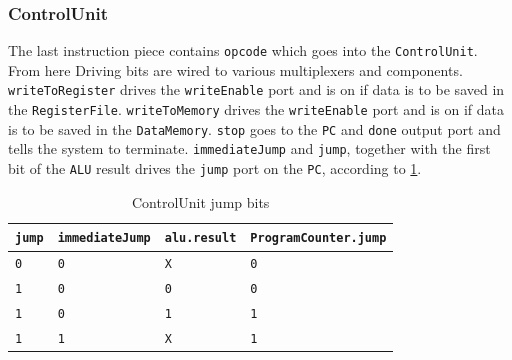 \documentclass[a4paper, english]{article}
\numberwithin{equation}{section}
\begin{document}
\subsubsection{ControlUnit}
The last instruction piece contains \texttt{opcode} which goes into the \texttt{ControlUnit}. From here Driving bits are wired to various multiplexers and components. \texttt{writeToRegister} drives the \texttt{writeEnable} port and is on if data is to be saved in the \texttt{RegisterFile}. \texttt{writeToMemory} drives the \texttt{writeEnable} port and is on if data is to be saved in the \texttt{DataMemory}. \texttt{stop} goes to the \texttt{PC} and \texttt{done} output port and tells the system to terminate. \texttt{immediateJump} and \texttt{jump}, together with the first bit of the \texttt{ALU} result drives the \texttt{jump} port on the \texttt{PC}, according to \cref{tbl:jmpbits}.
\begin{table}[H]
    \centering
    \caption{ControlUnit jump bits}\label{tbl:jmpbits}
    \begin{tabular}{llll}
        \toprule
        \texttt{jump} & \texttt{immediateJump} & \texttt{alu.result} & \texttt{ProgramCounter.jump} \\
        \midrule
        \texttt{0}    & \texttt{0}             & \texttt{X}          & \texttt{0}                   \\
        \texttt{1}    & \texttt{0}             & \texttt{0}          & \texttt{0}                   \\
        \texttt{1}    & \texttt{0}             & \texttt{1}          & \texttt{1}                   \\
        \texttt{1}    & \texttt{1}             & \texttt{X}          & \texttt{1}                   \\
        \bottomrule
    \end{tabular}
\end{table}
\end{document}
